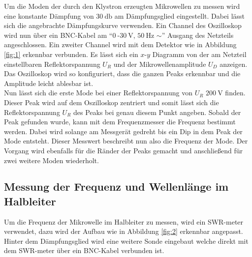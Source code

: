 Um die Moden der durch den Klystron erzeugten Mikrowellen zu messen wird eine konstante Dämpfung von $\SI{30}{\decibel}$ am Dämpfungsglied eingestellt. 
Dabei lässt sich die angebrachte Dämpfungskurve verwenden. Ein Channel des Oszilloskop wird nun
über ein BNC-Kabel am \enquote{$\SI{0}{}$-$\SI{30}{\volt}$, $\SI{50}{\hertz}$ $\sim$} Ausgang des Netzteils angeschlossen. Ein zweiter Channel wird mit dem Detektor wie in Abbildung \ref{fig:1}
erkennbar verbunden. Es lässt sich ein $x$-$y$ Diagramm von der am Netzteil einstellbaren Reflektorspannung $U_R$ und der Mikrowellenamplitude $U_D$ anzeigen. Das Oszilloskop wird so konfiguriert, dass die ganzen Peaks erkennbar 
und die Amplitude leicht ablesbar ist. 
\\
\newline
Nun lässt sich die erste Mode bei einer Reflektorspannung von $U_R$ \approx $\SI{200}{\volt}$ finden. Dieser Peak wird auf dem Oszilloskop zentriert und somit lässt sich die Reflektorspannung $U_R$ des Peaks bei genau diesem Punkt angeben.
Sobald der Peak gefunden wurde, kann mit dem Frequenzmesser die Frequenz bestimmt werden. Dabei wird solange am Messgerät gedreht bis ein Dip in dem Peak der Mode entsteht. Dieser Messwert beschreibt nun also die Frequenz der Mode.
Der Vorgang wird ebenfalls für die Ränder der Peaks gemacht und anschließend für zwei weitere Moden wiederholt.
\\
\subsection{Messung der Frequenz und Wellenlänge im Halbleiter}
Um die Frequenz der Mikrowelle im Halbleiter zu messen, wird ein SWR-meter verwendet, dazu wird der Aufbau wie in Abbildung \ref{fig:2} erkennbar angepasst. Hinter dem Dämpfungsglied wird eine weitere Sonde eingebaut welche direkt mit dem SWR-meter über
ein BNC-Kabel verbunden ist.

